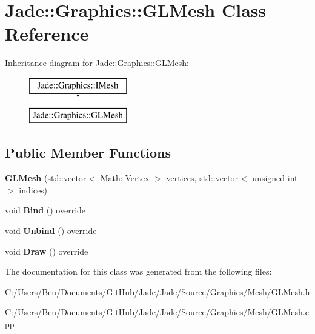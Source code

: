 \hypertarget{class_jade_1_1_graphics_1_1_g_l_mesh}{}\section{Jade\+:\+:Graphics\+:\+:G\+L\+Mesh Class Reference}
\label{class_jade_1_1_graphics_1_1_g_l_mesh}
Inheritance diagram for Jade\+:\+:Graphics\+:\+:G\+L\+Mesh\+:\begin{figure}[H]
\begin{center}
\leavevmode
\includegraphics[height=2.000000cm]{class_jade_1_1_graphics_1_1_g_l_mesh}
\end{center}
\end{figure}
\subsection*{Public Member Functions}
\begin{DoxyCompactItemize}
\item 
\hypertarget{class_jade_1_1_graphics_1_1_g_l_mesh_a677cf6bfbc8c053087d7ca8f6eeb4d7a}{}{\bfseries G\+L\+Mesh} (std\+::vector$<$ \hyperlink{struct_jade_1_1_math_1_1_vertex}{Math\+::\+Vertex} $>$ vertices, std\+::vector$<$ unsigned int $>$ indices)\label{class_jade_1_1_graphics_1_1_g_l_mesh_a677cf6bfbc8c053087d7ca8f6eeb4d7a}

\item 
\hypertarget{class_jade_1_1_graphics_1_1_g_l_mesh_a01f15b1a655e27d761648e665ee81b9b}{}void {\bfseries Bind} () override\label{class_jade_1_1_graphics_1_1_g_l_mesh_a01f15b1a655e27d761648e665ee81b9b}

\item 
\hypertarget{class_jade_1_1_graphics_1_1_g_l_mesh_ad169b59548696470294bf661cb2e87cf}{}void {\bfseries Unbind} () override\label{class_jade_1_1_graphics_1_1_g_l_mesh_ad169b59548696470294bf661cb2e87cf}

\item 
\hypertarget{class_jade_1_1_graphics_1_1_g_l_mesh_a3f0484793be95a7c479e959f135dde93}{}void {\bfseries Draw} () override\label{class_jade_1_1_graphics_1_1_g_l_mesh_a3f0484793be95a7c479e959f135dde93}

\end{DoxyCompactItemize}


The documentation for this class was generated from the following files\+:\begin{DoxyCompactItemize}
\item 
C\+:/\+Users/\+Ben/\+Documents/\+Git\+Hub/\+Jade/\+Jade/\+Source/\+Graphics/\+Mesh/G\+L\+Mesh.\+h\item 
C\+:/\+Users/\+Ben/\+Documents/\+Git\+Hub/\+Jade/\+Jade/\+Source/\+Graphics/\+Mesh/G\+L\+Mesh.\+cpp\end{DoxyCompactItemize}
